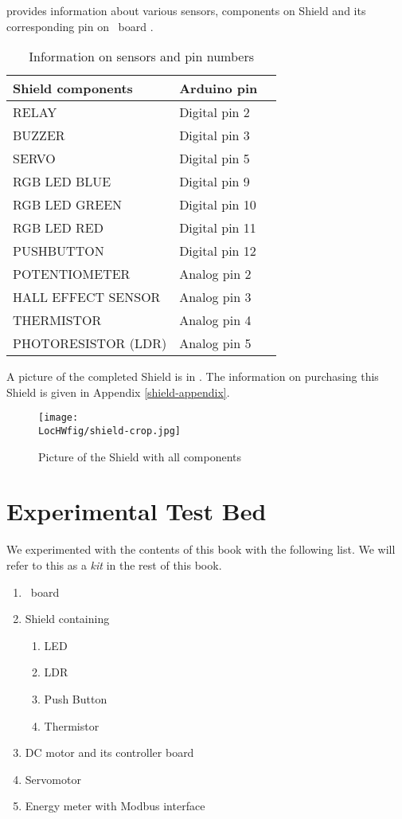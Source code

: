  provides information about various sensors,
components on Shield and its corresponding pin on \arduino\ board
\cite{shield-ref}.
\begin{table}
  \centering
  \caption{Information on sensors and pin numbers}
  \label{shield-table}
  \begin{tabular}{llc}
    \hline
    Shield components   & Arduino pin    \\ \hline
    RELAY               & Digital pin 2  \\
    BUZZER              & Digital pin 3  \\
    SERVO               & Digital pin 5  \\
    RGB LED BLUE        & Digital pin 9  \\
    RGB LED GREEN       & Digital pin 10 \\
    RGB LED RED         & Digital pin 11 \\
    PUSHBUTTON          & Digital pin 12 \\
    POTENTIOMETER       & Analog pin 2   \\
    HALL EFFECT SENSOR  & Analog pin 3   \\
    THERMISTOR          & Analog pin 4   \\
    PHOTORESISTOR (LDR) & Analog pin 5   \\

    \hline
  \end{tabular}
\end{table}
A picture of the completed Shield is in . The information on purchasing this Shield is given in Appendix \ref{shield-appendix}.
\begin{figure}
  \centering
  \texttt{[image: \\LocHWfig/shield-crop.jpg]}
  \caption{Picture of the Shield with all components}
  \label{shield}
\end{figure}

\section{Experimental Test Bed}
We experimented with the contents of this book with the
following list.  We will refer to this as a \emph{kit} in the rest of
this book.
\begin{enumerate}
  \item \arduino\ board
  \item Shield containing
        \begin{enumerate}
          \item LED
          \item LDR
          \item Push Button
          \item Thermistor
        \end{enumerate}
  \item DC motor and its controller board
  \item Servomotor
  \item Energy meter with Modbus interface
\end{enumerate}

